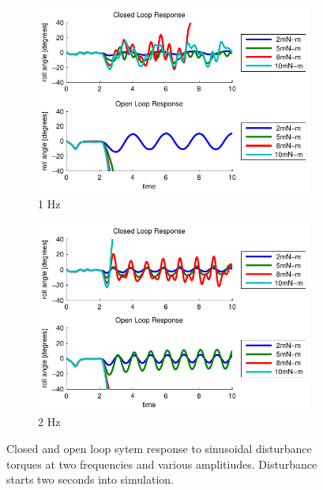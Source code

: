 \begin{figure}[t]
    \centering
    \begin{subfigure}[b]{0.49\textwidth}
        \centering
        \includegraphics[width = \textwidth]{figures/torques_small.pdf}
        \caption{1 Hz}
        \label{fig:results1Hz}
    \end{subfigure}
    \begin{subfigure}[b]{0.49\textwidth}
        \centering
        \includegraphics[width = \textwidth]{figures/torques_small2.pdf}
        \caption{2 Hz}
        \label{fig:results2Hz}
    \end{subfigure}
    \caption{Closed and open loop sytem response to sinusoidal disturbance torques at two frequencies and various amplitiudes. Disturbance starts two seconds into simulation.}
\end{figure}

